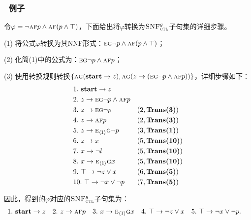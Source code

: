\documentclass[9pt, CJK]{beamer}
\begin{document}
\begin{frame}
	\frametitle{~例子}
	\begin{example}\label{exmp:transbot}
		\tiny
		令$\varphi=\neg \textsc{a} \textsc{f} p \wedge \textsc{a}\textsc{f}(p \wedge \top)$，下面给出将$\varphi$转换为${\textsc{SNF}_{\textsc{ctl}}^g}$子句集的详细步骤。
		
		(1) 将公式$\varphi$转换为其NNF形式：$\textsc{e}\textsc{g} \neg p \wedge \textsc{a}\textsc{f}(p \wedge \top)$；
		
		(2) 化简(1)中的公式为：$\textsc{e}\textsc{g} \neg p \wedge \textsc{a}\textsc{f} p$；
		
		(3) 使用转换规则转换$\{\textsc{a}\textsc{g}(\textbf{start} \rightarrow z), \textsc{a}\textsc{g}(z \rightarrow (\textsc{e}\textsc{g} \neg p \wedge \textsc{a}\textsc{f} p))\}$，详细步骤如下：
		\begin{align*}
			&1.\ \textbf{start} \rightarrow z && \\
			&2.\ z \rightarrow \textsc{e}\textsc{g} \neg p \wedge \textsc{a}\textsc{f} p &&  \\
			&3.\ z \rightarrow  \textsc{e}\textsc{g} \neg p && (2, \textbf{Trans(3)})\\
			&4.\ z \rightarrow \textsc{a}\textsc{f} p && (2, \textbf{Trans(3)})\\
			&5.\ z \rightarrow  \textsc{e}_{{\langle{1}\rangle}}\textsc{g} \neg p  && (3, \textbf{Trans(1)})\\
			&6.\ z \rightarrow x && (5, \textbf{Trans(10)})\\
			&7.\ x\rightarrow \neg l && (5, \textbf{Trans(10)})\\
			&8.\ x\rightarrow \textsc{e}_{{\langle{1}\rangle}} \textsc{g} x&& (5, \textbf{Trans(10)})\\
			&9.\ \top \rightarrow \neg z \vee x && (6, \textbf{Trans(5)}) \\
			&10.\ \top \rightarrow \neg x \vee \neg p && (7, \textbf{Trans(5)}) 
		\end{align*}
		
		因此，得到的$\varphi$对应的${\textsc{SNF}_{\textsc{ctl}}^g}$子句集为：
		\begin{align*}
			&1.\ \textbf{start} \rightarrow z && 2.\ z \rightarrow \textsc{a}\textsc{f} p && 3.\ x\rightarrow \textsc{e}_{{\langle{1}\rangle}} \textsc{g} x
			&& 4.\ \top \rightarrow \neg z \vee x && 5.\ \top \rightarrow \neg x \vee \neg p.
		\end{align*}
	\end{example}
\end{frame}
\end{document}
